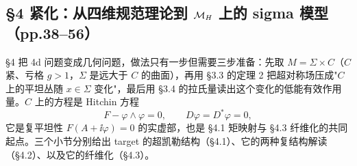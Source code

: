 \subsection*{\S4 紧化：从四维规范理论到 $\mathcal{M}_H$ 上的 sigma 模型（pp.38--56）}

\S4 把 4d 问题变成几何问题，做法只有一步但需要三步准备：先取 $M=\Sigma\times C$（$C$ 紧、亏格 $g>1$，$\Sigma$ 是远大于 $C$ 的曲面），再用 \S3.3 的定理 2 把超对称场压成"$C$ 上的平坦丛随 $x\in\Sigma$ 变化"，最后用 \S3.4 的拉氏量读出这个变化的低能有效作用量。$C$ 上的方程是 Hitchin 方程
\begin{equation}\label{l1:hitchin}\tag{4.1}
F-\varphi\wedge\varphi=0,\qquad D\varphi=D^*\varphi=0 ,
\end{equation}
它是复平坦性 $F(A+\ii\varphi)=0$ 的实虚部，也是 \S4.1 矩映射与 \S4.3 纤维化的共同起点。三个小节分别给出 target 的超凯勒结构（\S4.1）、它的两种复结构解读（\S4.2）、以及它的纤维化（\S4.3）。\pA{}


